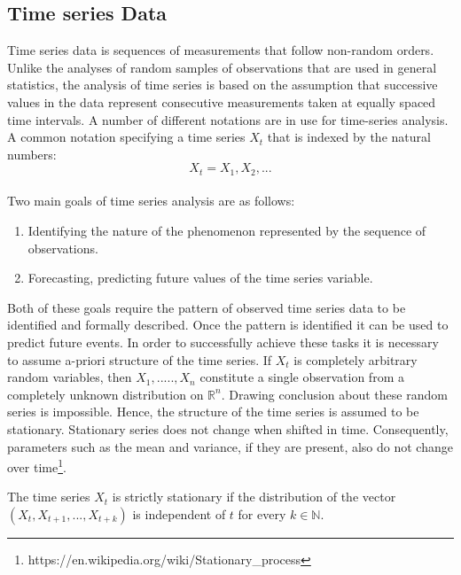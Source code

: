 \subsection{Time series Data}
\label{sub:Timeseriesdata}
Time series data is sequences of measurements that follow non-random orders\cite{shumway2006time}. Unlike the analyses of random samples of observations that are used in general statistics, the analysis of time series is based on the assumption that successive values in the data represent consecutive measurements taken at equally spaced time intervals. A number of different notations are in use for time-series analysis. A common notation specifying a time series \(X_{t}\) that is indexed by the natural numbers\cite{timeseriesdefinition}:
\begin{equation}
  X_{t}={X_{1},X_{2}, ...}
\end{equation}
\\
Two main goals of time series analysis are as follows:
\begin{enumerate}
  \item Identifying the nature of the phenomenon represented by the sequence of observations.
  \item Forecasting, predicting future values of the time series variable.
\end{enumerate}
Both of these goals require the pattern of observed time series data to be identified and formally described. Once the pattern is identified it can be used to predict future events. In order to successfully achieve these tasks it is necessary to assume a-priori structure of the time series. If \(X_{t}\) is completely arbitrary random variables, then \(X_{1},.....,X_{n}\) constitute a single observation from a completely unknown distribution on \(\mathbb{R}^n\)\cite{timeseriesdefinition}. Drawing conclusion about these random series is impossible. Hence, the structure of the time series is assumed to be stationary. Stationary series does not change when shifted in time. Consequently, parameters such as the mean and variance, if they are present, also do not change over time\footnote{https://en.wikipedia.org/wiki/Stationary\_process}.
\theoremstyle{definition}
\begin{definition}{}
The time series \(X_{t}\) is strictly stationary\cite{timeseriesdefinition} if the distribution of the vector \((X_{t},X_{t+1},...,X_{t+k})\) is independent of \(t\) for every \(k \in \mathbb{N}\).
\end{definition}

